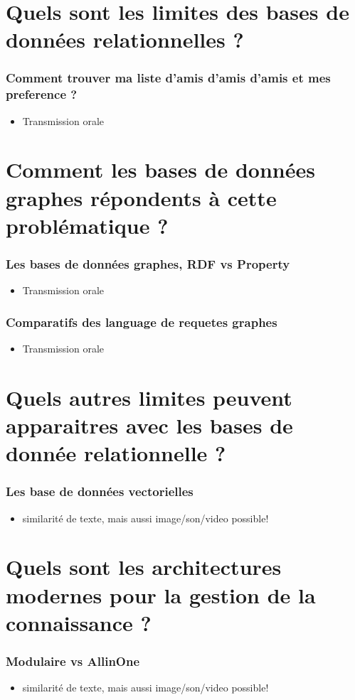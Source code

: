 \documentclass{beamer}
\begin{document}
\section{Quels sont les limites des bases de données relationnelles ?}

\begin{frame}
  \frametitle{Comment trouver ma liste d'amis d'amis d'amis et mes preference ?}
  \begin{itemize}
    \item Transmission orale
  \end{itemize}
\end{frame}


\section{Comment les bases de données graphes répondents à cette problématique ?}

\begin{frame}
  \frametitle{Les bases de données graphes, RDF vs Property}
  \begin{itemize}
    \item Transmission orale
  \end{itemize}
\end{frame}


\begin{frame}
  \frametitle{Comparatifs des language de requetes graphes}
  \begin{itemize}
    \item Transmission orale
  \end{itemize}
\end{frame}


\section{Quels autres limites peuvent apparaitres avec les bases de donnée relationnelle ?}

\begin{frame}
  \frametitle{Les base de données vectorielles}
  \begin{itemize}
    \item similarité de texte, mais aussi image/son/video possible!
  \end{itemize}
\end{frame}


\section{Quels sont les architectures modernes pour la gestion de la connaissance ?}

\begin{frame}
  \frametitle{Modulaire vs AllinOne}
  \begin{itemize}
    \item similarité de texte, mais aussi image/son/video possible!
  \end{itemize}
\end{frame}
\end{document}
